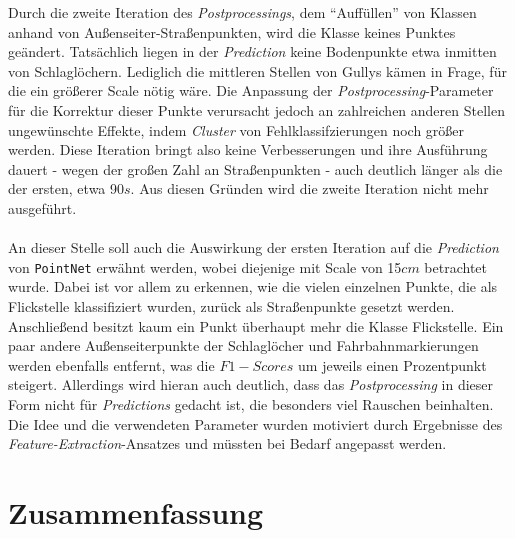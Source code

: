 Durch die zweite Iteration des \textit{Postprocessings}, dem ``Auffüllen'' von Klassen anhand von Außenseiter-Straßenpunkten, wird die Klasse keines Punktes geändert. Tatsächlich liegen in der \textit{Prediction} keine Bodenpunkte etwa inmitten von Schlaglöchern. Lediglich die mittleren Stellen von Gullys kämen in Frage, für die ein größerer Scale nötig wäre. Die Anpassung der \textit{Postprocessing}-Parameter für die Korrektur dieser Punkte verursacht jedoch an zahlreichen anderen Stellen ungewünschte Effekte, indem \textit{Cluster} von Fehlklassifzierungen noch größer werden. Diese Iteration bringt also keine Verbesserungen und ihre Ausführung dauert - wegen der großen Zahl an Straßenpunkten - auch deutlich länger als die der ersten, etwa 90$s$. Aus diesen Gründen wird die zweite Iteration nicht mehr ausgeführt. \\\\
An dieser Stelle soll auch die Auswirkung der ersten Iteration auf die \textit{Prediction} von \texttt{PointNet} erwähnt werden, wobei diejenige mit Scale von 15$cm$ betrachtet wurde. Dabei ist vor allem zu erkennen, wie die vielen einzelnen Punkte, die als Flickstelle klassifiziert wurden, zurück als Straßenpunkte gesetzt werden. Anschließend besitzt kaum ein Punkt überhaupt mehr die Klasse Flickstelle. Ein paar andere Außenseiterpunkte der Schlaglöcher und Fahrbahnmarkierungen werden ebenfalls entfernt, was die $F1-Scores$ um jeweils einen Prozentpunkt steigert. Allerdings wird hieran auch deutlich, dass das \textit{Postprocessing} in dieser Form nicht für \textit{Predictions} gedacht ist, die besonders viel Rauschen beinhalten. Die Idee und die verwendeten Parameter wurden motiviert durch Ergebnisse des \textit{Feature-Extraction}-Ansatzes und müssten bei Bedarf angepasst werden.

\section{Zusammenfassung} 

